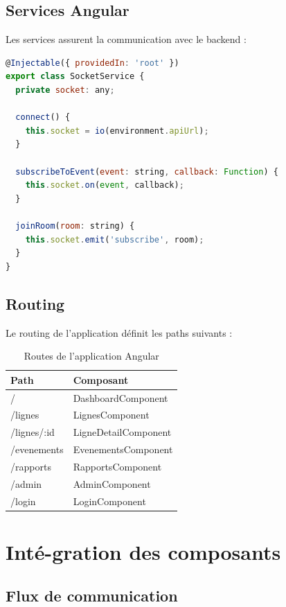 \subsection{Services Angular}

Les services assurent la communication avec le backend :

\begin{lstlisting}[language=JavaScript,caption={Service de communication temps r\'eel},label={lst:socket_service}]
@Injectable({ providedIn: 'root' })
export class SocketService {
  private socket: any;

  connect() {
    this.socket = io(environment.apiUrl);
  }

  subscribeToEvent(event: string, callback: Function) {
    this.socket.on(event, callback);
  }

  joinRoom(room: string) {
    this.socket.emit('subscribe', room);
  }
}
\end{lstlisting}

\subsection{Routing}

Le routing de l'application d\'efinit les paths suivants :

\begin{table}[htbp]
\centering
\renewcommand{\arraystretch}{1.3}
\begin{tabular}{l l}
\toprule
\textbf{Path} & \textbf{Composant} \\
\midrule
/ & DashboardComponent \\
/lignes & LignesComponent \\
/lignes/:id & LigneDetailComponent \\
/evenements & EvenementsComponent \\
/rapports & RapportsComponent \\
/admin & AdminComponent \\
/login & LoginComponent \\
\bottomrule
\end{tabular}
\caption{Routes de l'application Angular}
\label{tab:routes_angular}
\end{table}

\section{Int\'e-gration des composants}

\subsection{Flux de communication}


